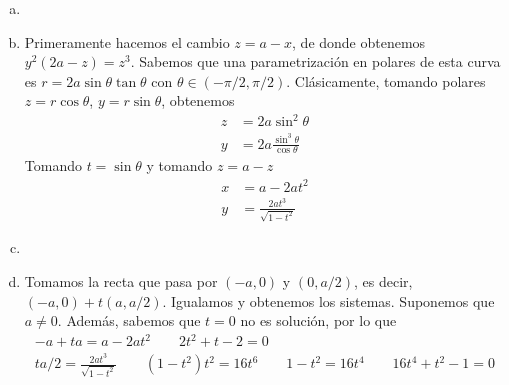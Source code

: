 \documentclass[twoside]{article}
\begin{document}
\begin{solucion}
\begin{enumerate}[a.]
\item[]
\item Primeramente hacemos el cambio $z=a-x$, de donde obtenemos $y^2(2a-z)=z^3$. Sabemos que una parametrización en polares de esta curva es $ r=2a\sin \theta \tan \theta$ con $\theta\in(-\pi/2,\pi/2)$. Clásicamente, tomando polares $z=r\cos \theta$, $y=r\sin \theta$, obtenemos
\begin{align*}
z&=2a\sin^2\theta\\
y&= 2a\frac{\sin^3\theta}{\cos \theta}
\end{align*}
Tomando $t = \sin \theta$ y tomando $z=a-z$
\begin{align*}
x&=a-2at^2\\
y&=\frac{2at^3}{\sqrt{1-t^2}}
\end{align*}
\item 
\item Tomamos la recta que pasa por $(-a,0)$ y $(0,a/2)$, es decir, $(-a,0)+t(a,a/2)$. Igualamos y obtenemos los sistemas. Suponemos que $a\neq 0$. Además, sabemos que $t=0$ no es solución, por lo que
\begin{gather*}
-a+ta = a-2at^2 \qquad 2t^2	+t-2=0\\
ta/2 = \frac{2at^3}{\sqrt{1-t^2}} \qquad (1-t^2)t^2 = 16t^6 \qquad 1-t^2 = 16t^4 \qquad 16t^4+t^2-1=0
\end{gather*}
\end{enumerate}
\end{solucion}

\newpage
\end{document}
